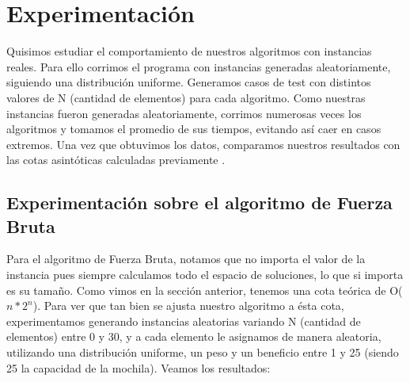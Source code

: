 \section{Experimentación}

Quisimos estudiar el comportamiento de nuestros algoritmos con instancias reales. Para ello corrimos el programa con instancias generadas aleatoriamente, siguiendo una distribución uniforme. Generamos casos de test con distintos valores de N (cantidad de elementos) para cada algoritmo. Como nuestras instancias fueron generadas aleatoriamente, corrimos numerosas veces los algoritmos y tomamos el promedio de sus tiempos, evitando así caer en casos extremos.
Una vez que obtuvimos los datos, comparamos nuestros resultados con las cotas asintóticas calculadas previamente .


\subsection{Experimentación sobre el algoritmo de Fuerza Bruta}
Para el algoritmo de Fuerza Bruta, notamos que no importa el valor de la instancia pues siempre calculamos todo el espacio de soluciones, lo que si importa es su tamaño. Como vimos en la sección anterior, tenemos una cota teórica de O($n*2^{n}$). Para ver que tan bien se ajusta nuestro algoritmo a ésta cota, experimentamos generando instancias aleatorias variando N (cantidad de elementos) entre 0 y 30, y a cada elemento le asignamos de manera aleatoria, utilizando una distribución uniforme, un peso y un beneficio entre 1 y 25 (siendo 25 la capacidad de la mochila). Veamos los resultados:

